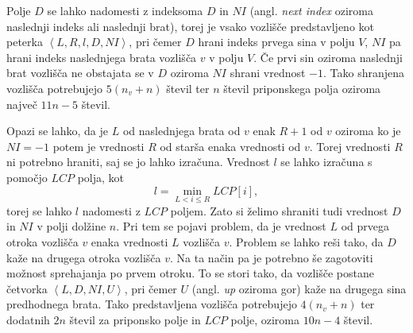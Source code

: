 Polje $D$ se lahko nadomesti z indeksoma $D$ in $NI$ (angl. \textit{next index} oziroma naslednji indeks ali naslednji brat), torej je vsako vozlišče predstavljeno kot peterka $\left< L, R, l, D, NI \right>$, pri čemer $D$ hrani indeks prvega sina v polju $V$, $NI$ pa hrani indeks naslednjega brata vozlišča $v$ v polju $V$. Če prvi sin oziroma naslednji brat vozlišča ne obstajata se v $D$ oziroma $NI$ shrani vrednost $-1$. Tako shranjena vozlišča potrebujejo $5(n_v+n)$ števil ter $n$ števil priponskega polja oziroma največ $11n-5$ števil.

Opazi se lahko, da je $L$ od naslednjega brata od $v$ enak $R+1$ od $v$ oziroma ko je $NI=-1$ potem je vrednosti $R$ od starša enaka vrednosti od $v$. Torej vrednosti $R$ ni potrebno hraniti, saj se jo lahko izračuna. Vrednost $l$ se lahko izračuna s pomočjo $LCP$ polja, kot
$$l=\min_{L<i\le R}LCP[i],$$
torej se lahko $l$ nadomesti z $LCP$ poljem. Zato si želimo shraniti tudi vrednost $D$ in $NI$ v polji dolžine $n$. Pri tem se pojavi problem, da je vrednost $L$ od prvega otroka vozlišča $v$ enaka vrednosti $L$ vozlišča $v$. Problem se lahko reši tako, da $D$ kaže na drugega otroka vozlišča $v$. Na ta način pa je potrebno še zagotoviti možnost sprehajanja po prvem otroku. To se stori tako, da vozlišče postane četvorka $\left< L, D, NI, U \right>$, pri čemer $U$ (angl. \textit{up} oziroma gor) kaže na drugega sina predhodnega brata. Tako predstavljena vozlišča potrebujejo $4(n_v+n)$ ter dodatnih $2n$ števil za priponsko polje in $LCP$ polje, oziroma $10n-4$ števil.


